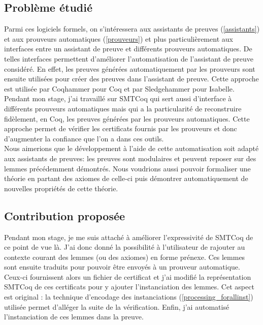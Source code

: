 \documentclass[11pt]{article}
\begin{document}
\subsection{Problème étudié}

Parmi ces logiciels formels, on s'intéressera aux assistants de preuves (\ref{assistants}) et aux prouveurs automatiques (\ref{prouveurs}) et plus particulièrement aux interfaces entre un assistant de preuve et différents prouveurs automatiques.  De telles interfaces permettent d'améliorer l'automatisation de l'assistant de preuve considéré. En effet, les preuves générées automatiquement par les prouveurs sont ensuite utilisées pour créer des preuves dans l'assistant de preuve. Cette approche est utilisée par Coqhammer \cite{coqhammer} pour Coq et par Sledgehammer \cite{sledgehammer_manual} pour Isabelle. \\
Pendant mon stage, j'ai travaillé sur SMTCoq qui sert aussi d'interface à différents prouveurs automatiques mais qui a la particularité de reconstruire fidèlement, en Coq, les preuves générées par les prouveurs automatiques. Cette approche permet de vérifier les certificats fournis par les prouveurs et donc d'augmenter la confiance que l'on a dans ces outils.\\

Nous aimerions que le développement à l'aide de cette automatisation soit adapté aux assistants de preuves: les preuves sont modulaires et peuvent reposer sur des lemmes précédemment démontrés. Nous voudrions aussi pouvoir formaliser une théorie en partant des axiomes de celle-ci puis démontrer automatiquement de nouvelles propriétés de cette théorie.

\subsection{Contribution proposée}

Pendant mon stage, je me suis attaché à améliorer l'expressivité de SMTCoq de ce point de vue là. J'ai donc donné la possibilité à l'utilisateur de rajouter au contexte courant des lemmes (ou des axiomes) en forme prénexe. Ces lemmes sont ensuite traduits pour pouvoir être envoyés à un prouveur automatique. Ceux-ci fournissent alors un fichier de certificat et j'ai modifié la représentation SMTCoq de ces certificats pour y ajouter l'instanciation des lemmes. Cet aspect est original : la technique d'encodage des instanciations (\ref{processing_forallinst}) utilisée permet d'alléger la suite de la vérification. Enfin, j'ai automatisé l'instanciation de ces lemmes dans la preuve.
\end{document}
